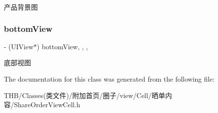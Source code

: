 产品背景图 \mbox{\label{interface_share_order_view_cell_a8b3d8449e076776cc9e342e00ef95ad6}} 
\subsubsection{\texorpdfstring{bottom\+View}{bottomView}}
{\footnotesize\ttfamily -\/ (U\+I\+View$\ast$) bottom\+View\hspace{0.3cm}{\ttfamily [read]}, {\ttfamily [write]}, {\ttfamily [nonatomic]}, {\ttfamily [strong]}}

底部视图 

The documentation for this class was generated from the following file\+:\begin{DoxyCompactItemize}
\item 
T\+H\+B/\+Classes(类文件)/附加首页/圈子/view/\+Cell/晒单内容/Share\+Order\+View\+Cell.\+h\end{DoxyCompactItemize}
